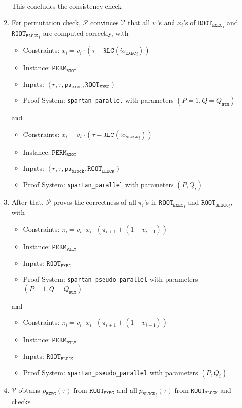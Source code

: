 \documentclass{article}
\newcommand{\code}{\texttt}
\newcommand{\Qsum}{Q_{\mathtt{sum}}}
\renewcommand{\P}{\mathcal{P}}
\newcommand{\V}{\mathcal{V}}
\newcommand{\RLC}{\mathtt{RLC}}
\newcommand{\iob}{io_{\mathtt{BLOCK}}}
\newcommand{\ioe}{io_{\mathtt{EXEC}}}
\newcommand{\ROOTE}{\mathtt{ROOT_{EXEC}}}
\newcommand{\ROOTB}{\mathtt{ROOT_{BLOCK}}}
\newcommand{\psb}{\mathtt{ps_{block}}}
\newcommand{\pse}{\mathtt{ps_{exec}}}
\begin{document}
\begin{enumerate}
    This concludes the consistency check.
    \item For permutation check, $\P$ convinces $\V$ that all $v_i$'s and $x_i$'s of ${\ROOTE}_i$ and ${\ROOTB}_i$ are computed correctly, with
    \begin{itemize}
        \item Constraints: $x_i = v_i \cdot (\tau - \RLC({\ioe}_i))$
        \item Instance: $\mathtt{PERM}_\mathtt{ROOT}$
        \item Inputs: $(r, \tau, \pse, \ROOTE)$
        \item Proof System: \code{spartan\_parallel} with parameters $(P = 1, Q = \Qsum)$
    \end{itemize}
    and
    \begin{itemize}
        \item Constraints: $x_i = v_i \cdot (\tau - \RLC({\iob}_i))$
        \item Instance: $\mathtt{PERM}_\mathtt{ROOT}$
        \item Inputs: $(r, \tau, \psb, \ROOTB)$
        \item Proof System: \code{spartan\_parallel} with parameters $(P, Q_i)$
    \end{itemize}
    \item After that, $\P$ proves the correctness of all $\pi_i$'s in ${\ROOTE}_i$ and ${\ROOTB}_i$, with
    \begin{itemize}
        \item Constraints: $\pi_i = v_i \cdot x_i \cdot (\pi_{i+1} + (1 - v_{i+1}))$
        \item Instance: $\mathtt{PERM}_\mathtt{POLY}$
        \item Inputs: $\ROOTE$
        \item Proof System: \code{spartan\_pseudo\_parallel} with parameters $(P = 1, Q = \Qsum)$
    \end{itemize}
    and
    \begin{itemize}
        \item Constraints: $\pi_i = v_i \cdot x_i \cdot (\pi_{i+1} + (1 - v_{i+1}))$
        \item Instance: $\mathtt{PERM}_\mathtt{POLY}$
        \item Inputs: $\ROOTB$
        \item Proof System: \code{spartan\_pseudo\_parallel} with parameters $(P, Q_i)$
    \end{itemize}
    \item $\V$ obtains $p_\mathtt{EXEC}(\tau)$ from $\ROOTE$ and all ${p_\mathtt{BLOCK}}_i(\tau)$ from $\ROOTB$ and checks

\end{enumerate}
\end{document}

